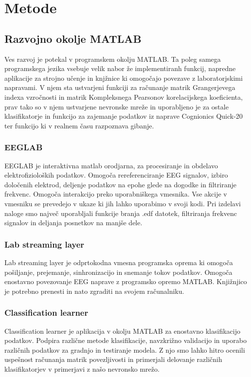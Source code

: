 \chapter{Metode}

\section{Razvojno okolje MATLAB}
Ves razvoj je potekal v programskem okolju MATLAB. Ta poleg samega programskega jezika vsebuje velik nabor že implementiranh funkcij, napredne aplikacije za strojno učenje in knjžnice ki omogočajo povezave z laboratorjskimi napravami. V njem sta ustvarjeni funkciji za računanje matrik Grangerjevega indexa vzročnosti
in matrik Kompleksnega Pearsonov korelacijskega koeficienta, prav tako so v njem ustvarjene nevronske mreže in uporabljeno je za ostale klasifikatorje in funkcijo za zajemanje podatkov iz naprave Cognionics Quick-20 ter funkcijo ki v realnem času razpoznava gibanje.
    
\subsection{EEGLAB}
EEGLAB je interaktivna matlab orodjarna, za procesiranje in obdelavo elektrofizioloških podatkov. Omogoča rereferenciranje EEG signalov, izbiro določenih elektrod, deljenje podatkov na epohe glede na dogodke in filtriranje frekvenc. Omogoča interakcijo preko uporabniškega vmesnika. Vse akcije v vmesniku se prevedejo v ukaze ki jih lahko uporabimo v svoji kodi. Pri izdelavi naloge smo največ uporabljali funkcije branja .edf datotek, filtriranja frekvenc signalov in deljanja posnetkov na manjše dele.\cite{noauthor_eeglab_nodate}

\subsection{Lab streaming layer}
Lab streaming layer je odprtokodna vmesna programska oprema ki omogoča pošiljanje, prejemanje, sinhronizacijo in snemanje tokov podatkov. Omogoča enostavno povezovanje EEG naprave z programsko opremo MATLAB. Knjižnjico je potrebno prenesti in nato zgraditi na svojem računalniku.  \cite{noauthor_lsl-website_nodate}

\subsection{Classification learner}
Classification learner je aplikacija v okolju MATLAB za enostavno klasifikacijo podatkov. Podpira različne metode klasifikacije, navzkrižno validacijo in uporabo različnih podatkov za gradnjo in testiranje modela. Z njo smo lahko hitro ocenili uspešnost računanja matrik povezljivosti in primerjali delovanje različnih klasifikatorjev v primerjavi z našo nevronsko mrežo.

